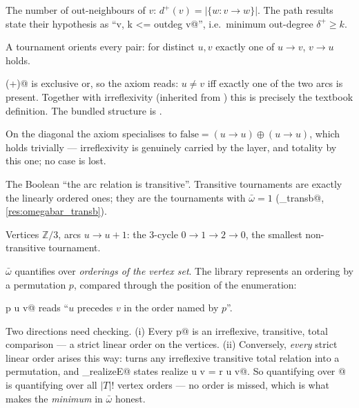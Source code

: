 \noindent The number of out-neighbours of $v$: $d^+(v) = |\{w : v \to
w\}|$. The path results state their hypothesis as
``\rocqinline@forall v, k <= outdeg v@'', i.e.\ minimum out-degree
$\delta^+ \ge k$.


A tournament orients every pair: for distinct $u,v$ exactly one of
$u \to v$, $v \to u$ holds.



\noindent
\rocqinline@(+)@ is exclusive or, so the axiom reads: $u \ne v$ iff
exactly one of the two arcs is present. Together with irreflexivity
(inherited from \rocqinline@Oriented@) this is precisely the textbook
definition. The bundled structure is \rocqinline@tournament@.

\begin{faithnote}
On the diagonal the axiom specialises to $\mathrm{false} =
(u \to u) \oplus (u \to u)$, which holds trivially --- irreflexivity
is genuinely carried by the \rocqinline@Oriented@ layer, and totality
by this one; no case is lost.
\end{faithnote}




\noindent The Boolean ``the arc relation is transitive''. Transitive
tournaments are exactly the linearly ordered ones; they are the
tournaments with $\bar\omega = 1$
(\rocqinline@omegabar_transb@, \cref{res:omegabar_transb}).




\noindent Vertices $\mathbb{Z}/3$, arcs $u \to u+1$: the 3-cycle
$0 \to 1 \to 2 \to 0$, the smallest non-transitive tournament.


$\bar\omega$ quantifies over \emph{orderings of the vertex set}. The
library represents an ordering by a permutation $p$, compared through
the position of the enumeration:



\noindent
\rocqinline@ltp p u v@ reads ``$u$ precedes $v$ in the order named by
$p$''.

\begin{faithnote}
Two directions need checking. (i) Every \rocqinline@ltp p@ is an
irreflexive, transitive, total comparison --- a strict linear order on
the vertices. (ii) Conversely, \emph{every} strict linear order arises
this way: \rocqinline@realize@ turns any irreflexive transitive total
relation \rocqinline@r@ into a permutation, and
\rocqinline@ltp_realizeE@ states \rocqinline@ltp realize u v = r u v@.
So quantifying over @ is quantifying over all
$|T|!$ vertex orders --- no order is missed, which is what makes the
\emph{minimum} in $\bar\omega$ honest.
\end{faithnote}

